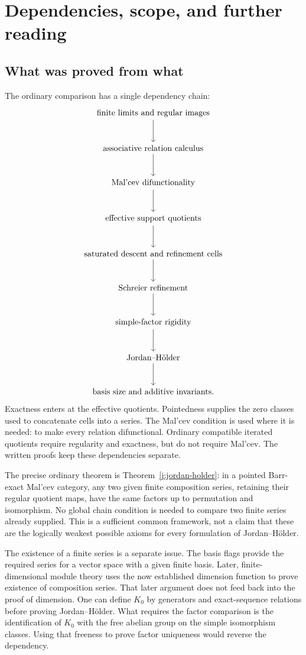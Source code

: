 \section{Dependencies, scope, and further reading}
\label{a:dependencies}

\subsection{What was proved from what}

The ordinary comparison has a single dependency chain:
\[
\begin{tikzcd}[column sep=small,row sep=large]
\text{finite limits and regular images}\arrow[d]\\
\text{associative relation calculus}\arrow[d]\\
\text{Mal'cev difunctionality}\arrow[d]\\
\text{effective support quotients}\arrow[d]\\
\text{saturated descent and refinement cells}\arrow[d]\\
\text{Schreier refinement}\arrow[d]\\
\text{simple-factor rigidity}\arrow[d]\\
\text{Jordan--H\"older}\arrow[d]\\
\text{basis size and additive invariants}.
\end{tikzcd}
\]
Exactness enters at the effective quotients. Pointedness supplies the zero
classes used to concatenate cells into a series. The Mal'cev condition is
used where it is needed: to make every relation difunctional. Ordinary
compatible iterated quotients require regularity and exactness, but do not
require Mal'cev. The written proofs keep these dependencies separate.

The precise ordinary theorem is Theorem~\ref{j:jordan-holder}: in a
pointed Barr-exact Mal'cev category, any two given finite composition
series, retaining their regular quotient maps, have the same factors up
to permutation and isomorphism. No global chain condition is needed to
compare two finite series already supplied. This is a sufficient common
framework, not a claim that these are the logically weakest possible
axioms for every formulation of Jordan--H\"older.

The existence of a finite series is a separate issue. The basis flags
provide the required series for a vector space with a given finite basis.
Later, finite-dimensional module theory uses the now established dimension
function to prove existence of composition series. That later argument
does not feed back into the proof of dimension. One can define $K_0$ by
generators and exact-sequence relations before proving Jordan--H\"older.
What requires the factor comparison is the identification of $K_0$ with
the free abelian group on the simple isomorphism classes. Using that
freeness to prove factor uniqueness would reverse the dependency.

